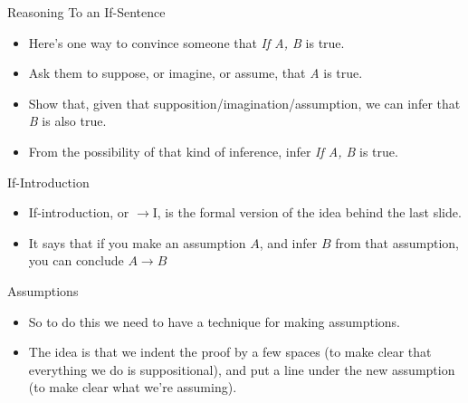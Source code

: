 \documentclass[
  ignorenonframetext,
]{beamer}
\providecommand{\tightlist}{%
  \setlength{\itemsep}{0pt}\setlength{\parskip}{0pt}}
\renewcommand{\,}{\text{, }}
\begin{document}
\begin{frame}{Reasoning To an If-Sentence}
\protect\hypertarget{reasoning-to-an-if-sentence}{}
\begin{itemize}
\tightlist
\item
  Here's one way to convince someone that \emph{If A, B} is true.
\item
  Ask them to suppose, or imagine, or assume, that \emph{A} is true.
\item
  Show that, given that supposition/imagination/assumption, we can infer
  that \emph{B} is also true.
\item
  From the possibility of that kind of inference, infer \emph{If A, B}
  is true.
\end{itemize}
\end{frame}

\begin{frame}{If-Introduction}
\protect\hypertarget{if-introduction}{}
\begin{itemize}
\tightlist
\item
  If-introduction, or \(\rightarrow\)I, is the formal version of the
  idea behind the last slide.
\item
  It says that if you make an assumption \(A\), and infer \(B\) from
  that assumption, you can conclude \(A \rightarrow B\)
\end{itemize}
\end{frame}

\begin{frame}{Assumptions}
\protect\hypertarget{assumptions}{}
\begin{itemize}
\tightlist
\item
  So to do this we need to have a technique for making assumptions.
\item
  The idea is that we indent the proof by a few spaces (to make clear
  that everything we do is suppositional), and put a line under the new
  assumption (to make clear what we're assuming).
\end{itemize}
\end{frame}
\end{document}
